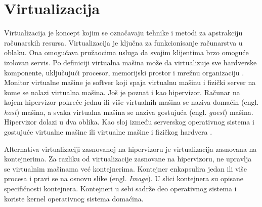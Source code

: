 \documentclass[12pt,oneside]{memoir}
\begin{document}

\section{Virtualizacija}
Virtualizacija je koncept kojim se označavaju tehnike i metodi za apstrakciju računarskih resursa. Virtualizacija je ključna za funkcionisanje računarstva u oblaku. Ona omogućava pružaocima usluga da svojim klijentima brzo omoguće izolovan servis. Po definiciji virtualna mašina može da virtualizuje sve hardverske komponente, uključujući procesor, memorijski prostor i mrežnu organizaciju \cite{ve}. Monitor virtualne mašine je softver koji spaja virtualnu mašinu i fizički server na kome se nalazi virtualna mašina. Još je poznat i kao hipervizor. Računar na kojem hipervizor pokreće jednu ili više virtualnih mašina se naziva domaćin (engl. \emph{host}) mašina, a svaka virtualna mašina se naziva gostujuća (engl. \emph{guest}) mašina. Hipervizor dolazi u dva oblika. Kao sloj između serverskog operativnog sistema i gostujuće virtualne mašine ili virtualne mašine i fizičkog hardvera \cite{ve}.


Alternativa virtualizaciji zasnovanoj na hipervizoru je virtualizacija zasnovana na kontejnerima. Za razliku od virtualizacije zasnovane na hipervizoru, ne upravlja se virtualnim mašinama već kontejnerima. Kontejner enkapsulira jedan ili više procesa i pravi se na osnovu slike (engl. \emph{Image}). U slici kontejnera su opisane specifičnosti kontejnera. Kontejneri u sebi sadrže deo operativnog sistema i koriste kernel operativnog sistema domaćina.
\end{document}
